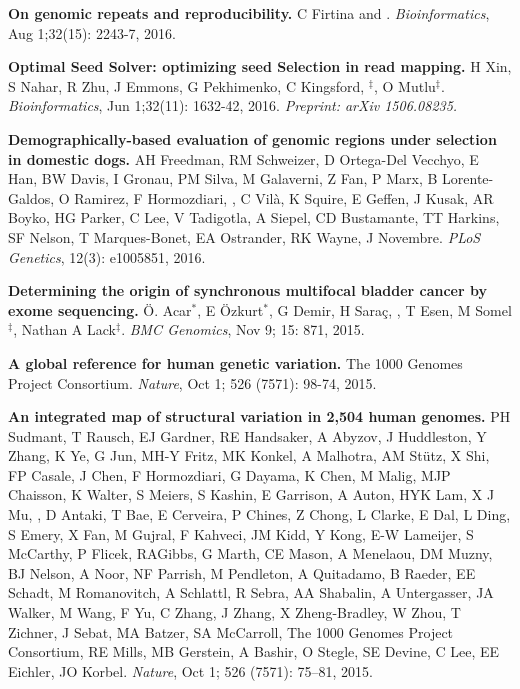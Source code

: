   \vspace{-.2cm}        
  {\bf On genomic repeats and reproducibility.}
  C Firtina and \calkan{}.
 {\em Bioinformatics}, Aug 1;32(15): 2243-7, 2016.

  \vspace{-.2cm}        
  {\bf Optimal Seed Solver: optimizing seed Selection in read mapping.}
  H Xin, S Nahar, R Zhu, J Emmons, G Pekhimenko, C Kingsford, \calkan{}$^\ddag$, O Mutlu$^\ddag$.
 {\em Bioinformatics}, Jun 1;32(11): 1632-42, 2016. \textit{Preprint: arXiv 1506.08235.}


  \vspace{-.2cm}        
  {\bf Demographically-based evaluation of genomic regions under selection in domestic dogs.}
AH Freedman, RM Schweizer, D Ortega-Del Vecchyo, E Han, BW Davis, I Gronau, PM Silva, M Galaverni, Z Fan, P Marx, B Lorente-Galdos, O Ramirez, F Hormozdiari, \calkan{}, C Vilà, K Squire, 
E Geffen, J Kusak, AR Boyko, HG Parker, C Lee, V Tadigotla, A Siepel, CD Bustamante, TT Harkins, SF Nelson, T Marques-Bonet, EA Ostrander, RK Wayne, J Novembre.
 {\em PLoS Genetics}, 12(3): e1005851, 2016.

  \vspace{-.2cm}        
  {\bf Determining the origin of synchronous multifocal bladder cancer by exome sequencing.} 
  Ö. Acar$^*$, E Özkurt$^*$, G Demir, H Saraç, \calkan{}, T Esen, M Somel$^\ddag$, Nathan A Lack$^\ddag$.
 {\em BMC Genomics}, Nov 9; 15: 871, 2015.

  \vspace{-.2cm}        
  {\bf A global reference for human genetic variation.} The 1000 Genomes Project Consortium.  {\em Nature}, Oct 1; 526 (7571): 98-74, 2015.

  \vspace{-.2cm}        
  {\bf An integrated map of structural variation in 2,504 human genomes.}
  PH Sudmant, T Rausch, EJ Gardner,  RE Handsaker, A Abyzov, J Huddleston, Y Zhang, K Ye, G Jun, MH-Y Fritz, MK Konkel, A Malhotra, AM Stütz, X Shi, FP Casale, J Chen, 
  F Hormozdiari, G Dayama, K Chen, M Malig, MJP Chaisson, K Walter, S Meiers, S Kashin, E Garrison, A Auton, HYK Lam, X J Mu, \calkan, D Antaki, T Bae, E Cerveira, P Chines, Z Chong, 
  L Clarke, E Dal, L Ding, S Emery, X Fan, M Gujral, F Kahveci, JM Kidd, Y Kong, E-W Lameijer, S McCarthy, P Flicek, RAGibbs, G Marth, CE Mason, A Menelaou, DM Muzny, 
  BJ Nelson, A Noor, NF Parrish, M Pendleton, A Quitadamo, B Raeder, EE Schadt, M Romanovitch, A Schlattl, R Sebra, AA Shabalin, A Untergasser, 
  JA Walker, M Wang, F Yu, C Zhang, J Zhang, X Zheng-Bradley, W Zhou, T Zichner, J Sebat, MA Batzer, SA McCarroll, 
  The 1000 Genomes Project Consortium, RE Mills, MB Gerstein, A Bashir, O Stegle, SE Devine, C Lee, EE Eichler, JO Korbel. 
  {\em Nature}, Oct 1; 526 (7571): 75–81, 2015.

